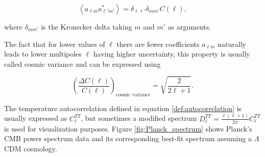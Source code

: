 \documentclass[openany,a4paper,12pt,oneside]{book}
\newcommand{\av}[1]{\left\langle #1 \right\rangle} %
\begin{document}
\begin{spacing}{1.5}
\begin{equation}\label{def:autocorrelation}
    \av{a_{\ell m} a^*_{\ell' m'}}=\delta_{\ell\ell'}\delta_{mm'}C(\ell),
\end{equation}

\noindent where $\delta_{mm'}$ is the Kronecker delta taking $m$ and $m'$ as arguments.

The fact that for lower values of $\ell$ there are fewer coefficients $a_{\ell m}$ naturally leads to lower multipoles $\ell$ having higher uncertainty, this property is usually called cosmic variance and can be expressed using\cite{dodelson2020modern} 

\begin{equation}\label{cosmic_variance}
    \left(\frac{\Delta C(\ell)}{C(\ell)}\right)_\text{cosmic variance}=\sqrt{\frac{2}{2\ell+1}}.
\end{equation}

The temperature autocorrelation defined in equation \eqref{def:autocorrelation} is usually expressed as $C_\ell^{TT}$, but sometimes a modified spectrum $D_\ell^{TT}=\frac{\ell(\ell+1)}{2\pi}C_\ell^{TT}$ is used for visualization purposes. Figure \ref{fig:Planck_spectrum} shows Planck's CMB power spectrum data and its corresponding best-fit spectrum assuming a $\Lambda$CDM cosmology.


\end{spacing}
\end{document}
